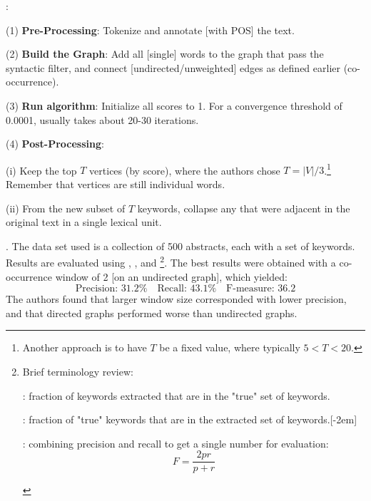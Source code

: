 \documentclass[11pt]{article}
\newcommand\myspace[1][]{\vspace{#1\bigskipamount}}
\newcommand\p{\Needspace{10\baselineskip} \noindent}
\begin{document}
\myspace{}
\p {}:
\begin{compactitem}
	\item[(1)] \textbf{Pre-Processing}: Tokenize and annotate [with POS] the text.\vspace{0.3em}
	
	\item[(2)] \textbf{Build the Graph}: Add all [single] words to the graph that pass the syntactic filter, and connect [undirected/unweighted] edges as defined earlier (co-occurrence).
	
	\item[(3)] \textbf{Run algorithm}: Initialize all scores to 1. For a convergence threshold of 0.0001, usually takes about 20-30 iterations.
	
	\item[(4)] \textbf{Post-Processing}: 
	\begin{compactitem}
		\item[(i)] Keep the top $T$ vertices (by score), where the authors chose $T = |V|/3$.\footnote{Another approach is to have $T$ be a fixed value, where typically $5 < T < 20$.} Remember that vertices are still individual words.
		
		\item[(ii)] From the new subset of $T$ keywords, collapse any that were adjacent in the original text in a single lexical unit.
	\end{compactitem}
\end{compactitem}

\myspace
\p {}. The data set used is a collection of 500 abstracts, each with a set of keywords. Results are evaluated using , , and \footnote{
	Brief terminology review:
	\begin{compactitem}
		\item {}: fraction of keywords extracted that are in the "true" set of keywords.
		\item {}: fraction of "true" keywords that are in the extracted set of keywords.
		\item {}: combining precision and recall to get a single number for evaluation:
		$$
		F = \frac{2pr}{p + r}
		$$
	\end{compactitem}
	}. %
The best results were obtained with a co-occurrence window of 2 [on an undirected graph], which yielded:
$$
\text{Precision: } 31.2\% \quad \text{Recall: } 43.1\% \quad \text{F-measure: } 36.2
$$
The authors found that larger window size corresponded with lower precision, and that directed graphs performed worse than undirected graphs.
\end{document}
